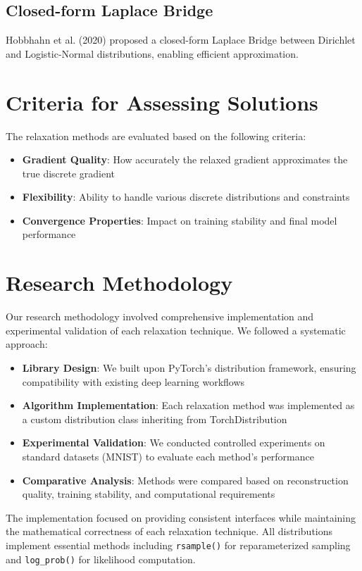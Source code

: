\documentclass[peerreview]{IEEEtran}
\begin{document}
\subsection{Closed-form Laplace Bridge}
Hobbhahn et al. (2020) proposed a closed-form Laplace Bridge between Dirichlet and Logistic-Normal distributions, enabling efficient approximation.

\section{Criteria for Assessing Solutions} \label{sec:criteria}
The relaxation methods are evaluated based on the following criteria:

\begin{itemize}
\item \textbf{Gradient Quality}: How accurately the relaxed gradient approximates the true discrete gradient
\item \textbf{Flexibility}: Ability to handle various discrete distributions and constraints
\item \textbf{Convergence Properties}: Impact on training stability and final model performance
\end{itemize}

\section{Research Methodology}
Our research methodology involved comprehensive implementation and experimental validation of each relaxation technique. We followed a systematic approach:

\begin{itemize}
\item \textbf{Library Design}: We built upon PyTorch's distribution framework, ensuring compatibility with existing deep learning workflows
\item \textbf{Algorithm Implementation}: Each relaxation method was implemented as a custom distribution class inheriting from TorchDistribution
\item \textbf{Experimental Validation}: We conducted controlled experiments on standard datasets (MNIST) to evaluate each method's performance
\item \textbf{Comparative Analysis}: Methods were compared based on reconstruction quality, training stability, and computational requirements
\end{itemize}

The implementation focused on providing consistent interfaces while maintaining the mathematical correctness of each relaxation technique. All distributions implement essential methods including \texttt{rsample()} for reparameterized sampling and \texttt{log\_prob()} for likelihood computation.
\end{document}
